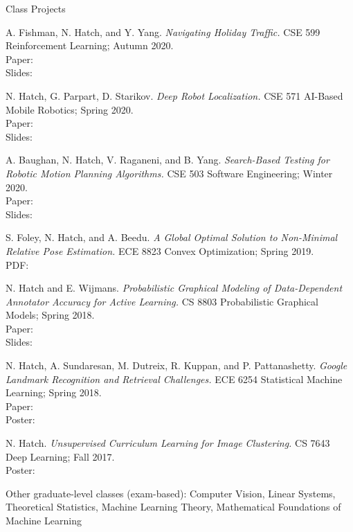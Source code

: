 \documentclass{resume} %
\begin{document}
\begin{rSection}{Class Projects}

A. Fishman, N. Hatch, and Y. Yang. {\em Navigating Holiday Traffic.} CSE 599 Reinforcement Learning; Autumn 2020. \\
Paper:  \\
Slides: 

N. Hatch, G. Parpart, D. Starikov. {\em Deep Robot Localization.} CSE 571 AI-Based Mobile Robotics; Spring 2020. \\
Paper:  \\
Slides: 

A. Baughan, N. Hatch, V. Raganeni, and B. Yang. {\em Search-Based Testing for Robotic Motion Planning Algorithms.} CSE 503 Software Engineering; Winter 2020. \\
Paper:  \\
Slides: 

S. Foley, N. Hatch, and A. Beedu. {\em A Global Optimal Solution to Non-Minimal Relative Pose Estimation.} ECE 8823 Convex Optimization; Spring 2019. \\
PDF: 

N. Hatch and E. Wijmans. {\em Probabilistic Graphical Modeling of Data-Dependent Annotator Accuracy for Active Learning.} CS 8803 Probabilistic Graphical Models; Spring 2018. \\
Paper:  \\
Slides: 

N. Hatch, A. Sundaresan, M. Dutreix, R. Kuppan, and P. Pattanashetty. {\em Google Landmark Recognition and Retrieval Challenges.} ECE 6254 Statistical Machine Learning; Spring 2018. \\
Paper:  \\
Poster: 

N. Hatch. {\em Unsupervised Curriculum Learning for Image Clustering.} CS 7643 Deep Learning; Fall 2017. \\
Poster: 

Other graduate-level classes (exam-based): Computer Vision, Linear Systems, Theoretical Statistics, Machine Learning Theory, Mathematical Foundations of Machine Learning
\end{rSection}
\end{document}
